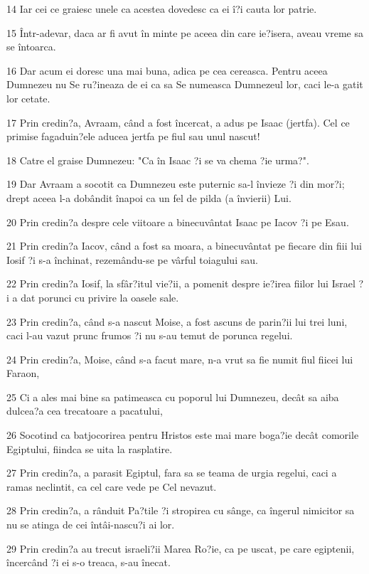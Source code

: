 \par 14 Iar cei ce graiesc unele ca acestea dovedesc ca ei î?i cauta lor patrie.
\par 15 Într-adevar, daca ar fi avut în minte pe aceea din care ie?isera, aveau vreme sa se întoarca.
\par 16 Dar acum ei doresc una mai buna, adica pe cea cereasca. Pentru aceea Dumnezeu nu Se ru?ineaza de ei ca sa Se numeasca Dumnezeul lor, caci le-a gatit lor cetate.
\par 17 Prin credin?a, Avraam, când a fost încercat, a adus pe Isaac (jertfa). Cel ce primise fagaduin?ele aducea jertfa pe fiul sau unul nascut!
\par 18 Catre el graise Dumnezeu: "Ca în Isaac ?i se va chema ?ie urma?".
\par 19 Dar Avraam a socotit ca Dumnezeu este puternic sa-l învieze ?i din mor?i; drept aceea l-a dobândit înapoi ca un fel de pilda (a învierii) Lui.
\par 20 Prin credin?a despre cele viitoare a binecuvântat Isaac pe Iacov ?i pe Esau.
\par 21 Prin credin?a Iacov, când a fost sa moara, a binecuvântat pe fiecare din fiii lui Iosif ?i s-a închinat, rezemându-se pe vârful toiagului sau.
\par 22 Prin credin?a Iosif, la sfâr?itul vie?ii, a pomenit despre ie?irea fiilor lui Israel ?i a dat porunci cu privire la oasele sale.
\par 23 Prin credin?a, când s-a nascut Moise, a fost ascuns de parin?ii lui trei luni, caci l-au vazut prunc frumos ?i nu s-au temut de porunca regelui.
\par 24 Prin credin?a, Moise, când s-a facut mare, n-a vrut sa fie numit fiul fiicei lui Faraon,
\par 25 Ci a ales mai bine sa patimeasca cu poporul lui Dumnezeu, decât sa aiba dulcea?a cea trecatoare a pacatului,
\par 26 Socotind ca batjocorirea pentru Hristos este mai mare boga?ie decât comorile Egiptului, fiindca se uita la rasplatire.
\par 27 Prin credin?a, a parasit Egiptul, fara sa se teama de urgia regelui, caci a ramas neclintit, ca cel care vede pe Cel nevazut.
\par 28 Prin credin?a, a rânduit Pa?tile ?i stropirea cu sânge, ca îngerul nimicitor sa nu se atinga de cei întâi-nascu?i ai lor.
\par 29 Prin credin?a au trecut israeli?ii Marea Ro?ie, ca pe uscat, pe care egiptenii, încercând ?i ei s-o treaca, s-au înecat.
